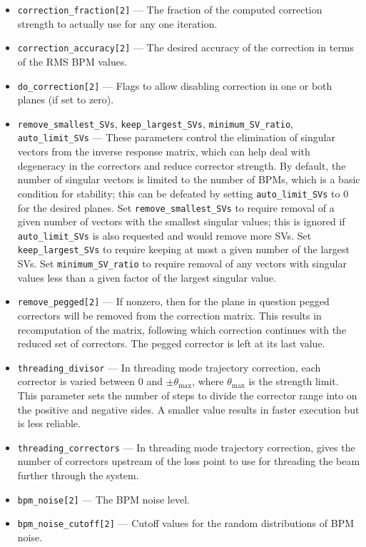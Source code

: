\documentclass[11pt]{article}
\begin{document}
\begin{itemize}
\item \verb|correction_fraction[2]| --- The fraction of the computed correction strength to actually use for any one iteration.
\item \verb|correction_accuracy[2]| --- The desired accuracy of the correction in terms of the RMS BPM values.
\item \verb|do_correction[2]| --- Flags to allow disabling correction in one or both planes (if set to zero).
\item \verb|remove_smallest_SVs|, \verb|keep_largest_SVs|, \verb|minimum_SV_ratio|, \verb|auto_limit_SVs| --- These parameters control the elimination of
  singular vectors from the inverse response matrix, which can help deal with degeneracy in the correctors and reduce corrector strength.
  By default, the number of singular vectors is limited to the number of BPMs, which is a basic condition for stability; this can be defeated by
  setting \verb|auto_limit_SVs| to 0 for the desired planes.  Set \verb|remove_smallest_SVs| to require removal of a given number of
  vectors with the smallest singular values; this is ignored if \verb|auto_limit_SVs| is also requested and would remove more SVs. 
  Set \verb|keep_largest_SVs| to require keeping at most a given number of the largest SVs.
  Set \verb|minimum_SV_ratio| to require removal of any vectors with singular values less than a given factor of the largest singular value.
\item \verb|remove_pegged[2]| --- If nonzero, then for the plane in question pegged correctors will be removed from the correction matrix.
  This results in recomputation of the matrix, following which correction continues with the reduced set of correctors.
  The pegged corrector is left at its last value.
\item \verb|threading_divisor| --- In threading mode trajectory correction, each corrector is varied between 0 and $\pm{\theta_{\textrm{max}}}$, 
  where $\theta_{\textrm{max}}$ is the strength limit.
  This parameter sets the number of steps to divide the corrector range into on the positive and negative sides.
  A smaller value results in faster execution but is less reliable.
\item \verb|threading_correctors| --- In threading mode trajectory correction, gives the number of correctors upstream of the loss point to
  use for threading the beam further through the system.
\item \verb|bpm_noise[2]| --- The BPM noise level. 
\item \verb|bpm_noise_cutoff[2]| --- Cutoff values for the random distributions of BPM noise.

\end{itemize}
\end{document}
